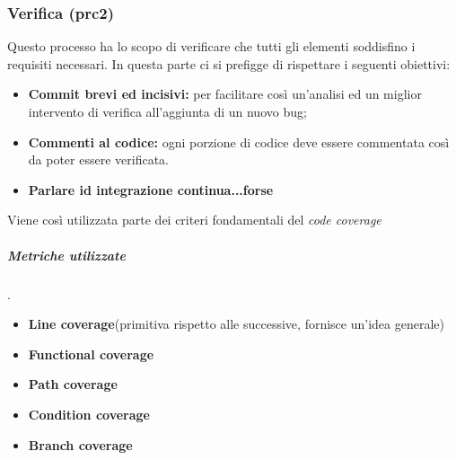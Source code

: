 \subsubsection{Verifica (prc2)}
Questo processo ha lo scopo di verificare che tutti gli elementi soddisfino i requisiti necessari. In questa parte ci si prefigge di rispettare i seguenti obiettivi:
\begin{itemize}
	\item{\textbf{Commit brevi ed incisivi:} per facilitare così un'analisi ed un miglior intervento di verifica all'aggiunta di un nuovo bug;}
	\item{\textbf{Commenti al codice:} ogni porzione di codice deve essere commentata così da poter essere verificata.}
	\item{\textbf{Parlare id integrazione continua...forse}}
\end{itemize}
Viene così utilizzata parte dei criteri fondamentali del \textit{code coverage}
\subparagraph{Metriche utilizzate}.
\begin{itemize}
	\item{\textbf{Line coverage}(primitiva rispetto alle successive, fornisce un'idea generale)}
	\item{\textbf{Functional coverage}}
	\item{\textbf{Path coverage}}
	\item{\textbf{Condition coverage}}
	\item{\textbf{Branch coverage}}
\end{itemize}
\begin{table}[!htpb]
\end{table}

